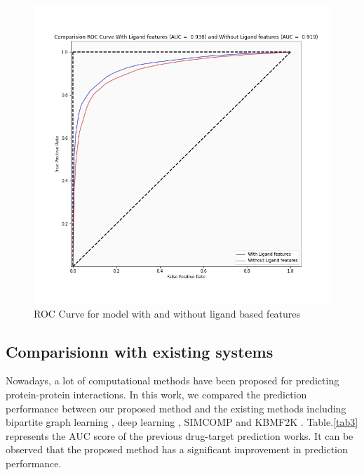 \documentclass[conference]{IEEEtran}
\begin{document}
\begin{figure}[htbp]
\centerline{\includegraphics[scale=0.27]{figures/fig5.jpeg}}
\caption{ROC Curve for model with and without ligand based features}
\label{f5}
\end{figure}
\subsection{Comparisionn with existing systems}
Nowadays, a lot of computational methods have been proposed for predicting protein-protein interactions. In this work, we compared the prediction performance between our proposed method and the existing methods including bipartite graph learning \cite{b19}, deep learning \cite{b8}, SIMCOMP \cite{b2} and KBMF2K \cite{b6}. Table.\ref{tab3} represents the AUC score of the previous drug-target prediction works. It can be observed that the proposed method has a significant improvement in prediction performance.
\end{document}

